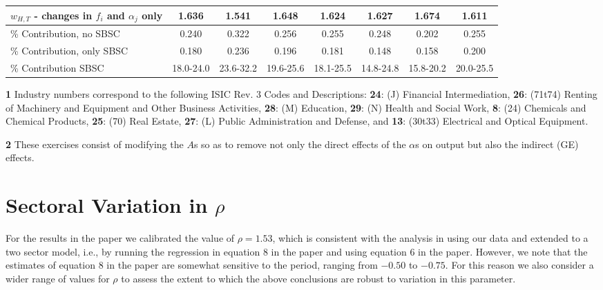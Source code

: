\documentclass[10pt]{article}
\begin{document}
\begin{landscape}
\begin{table}[!h]
\begin{threepartable}
{\begin{tabular}{l|c|cc|cc|cc}
$w_{H,T}$ - changes in $f_{i}$ and $\alpha_{j}$ only  & 1.636 & 1.541  & 1.648     & 1.624                          & 1.627             & 1.674          & 1.611        \\ \hline
\% Contribution, no SBSC      & 0.240        & 0.322        & 0.256                & 0.255                          & 0.248             & 0.202      & 0.255 \\
\% Contribution, only SBSC    & 0.180        & 0.236        & 0.196                & 0.181                          & 0.148             & 0.158        & 0.200 \\ \hline
\% Contribution SBSC          & 18.0-24.0    & 23.6-32.2    & 19.6-25.6            & 18.1-25.5                      & 14.8-24.8         & 15.8-20.2     & 20.0-25.5 \\ \hline \hline   
\end{tabular}%
}
\begin{tablenotes} \scriptsize
\item{\textbf{1}}  Industry numbers correspond to the following ISIC Rev. 3 Codes and Descriptions: \textbf{24}: (J) Financial Intermediation, \textbf{26}: (71t74) Renting of Machinery and Equipment and Other Business Activities, \textbf{28}: (M) Education, \textbf{29}: (N) Health and Social Work, \textbf{8}: (24) Chemicals and Chemical Products, \textbf{25}: (70) Real Estate, \textbf{27}: (L) Public Administration and Defense, and \textbf{13}: (30t33) Electrical and Optical Equipment.\\
\item{\textbf{2}} These exercises consist of modifying the $A$s so as to remove not only the direct effects of the $\alpha$s on output but also the indirect (GE) effects. \hline

\end{tablenotes}
\end{threepartable}
\end{table}
\end{landscape}

\clearpage
\newpage
\section{Sectoral Variation in $\rho$}

For the results in the paper we calibrated the value of $\rho =1.53$, which is consistent with the analysis in \citet{KatMur92} using our data and extended to a two sector model, i.e., by running the regression in equation 8 in the paper and using equation 6 in the paper. However, we note that the estimates of equation 8 in the paper are somewhat sensitive to the period, ranging from $-0.50$ to $-0.75$. For this reason we also consider a wider range of values for $\rho $ to assess the extent to which the above conclusions are robust to variation in this parameter.\\
\end{document}
